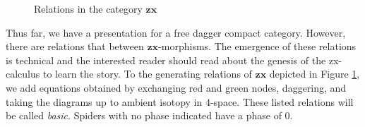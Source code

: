 \documentclass[]{amsart}
\theoremstyle{defn}
\begin{document}
\begin{figure}
	\caption{Relations in the category $\mathbf{zx}$}
	\label{fig:ZX equations}
\end{figure}

Thus far, we have a presentation for a free dagger compact category. However, there are relations that between $\mathbf{zx}$-morphisms.  The emergence of these relations is technical and the interested reader should read about the genesis of the zx-calculus \cite{CoeckeDuncan_QuantumObsFullPaper} to learn the story. To the generating relations of $\mathbf{zx}$ depicted in Figure \ref{fig:ZX equations}, we add equations obtained by exchanging red and green nodes, daggering, and taking the diagrams up to ambient isotopy in $4$-space. These listed relations will be called \emph{basic}.  Spiders with no phase indicated have a phase of $0$. 
\end{document}
